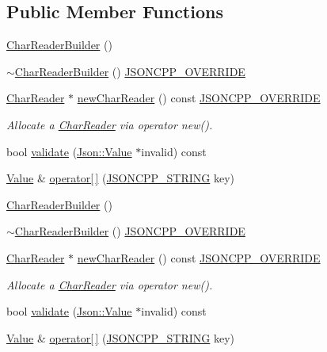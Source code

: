 \subsection*{Public Member Functions}
\begin{DoxyCompactItemize}
\item 
\hyperlink{class_json_1_1_char_reader_builder_a6e197b69a2ede3d87b03b9c5c78ba46a}{Char\+Reader\+Builder} ()
\item 
\hyperlink{class_json_1_1_char_reader_builder_ae8226503f5b947e9d618c39dd992c85c}{$\sim$\+Char\+Reader\+Builder} () \hyperlink{config_8h_a824d6199c91488107e443226fa6022c5}{J\+S\+O\+N\+C\+P\+P\+\_\+\+O\+V\+E\+R\+R\+I\+DE}
\item 
\hyperlink{class_json_1_1_char_reader}{Char\+Reader} $\ast$ \hyperlink{class_json_1_1_char_reader_builder_a3a262fcc76c1eb8eebfd4718fb4e9722}{new\+Char\+Reader} () const \hyperlink{config_8h_a824d6199c91488107e443226fa6022c5}{J\+S\+O\+N\+C\+P\+P\+\_\+\+O\+V\+E\+R\+R\+I\+DE}
\begin{DoxyCompactList}\small\item\em Allocate a \hyperlink{class_json_1_1_char_reader}{Char\+Reader} via operator new(). \end{DoxyCompactList}\item 
bool \hyperlink{class_json_1_1_char_reader_builder_af890b5cb70e9b372e41de5c9e6535d21}{validate} (\hyperlink{class_json_1_1_value}{Json\+::\+Value} $\ast$invalid) const
\item 
\hyperlink{class_json_1_1_value}{Value} \& \hyperlink{class_json_1_1_char_reader_builder_a84b35ef443340c06c0aa7b47851d8d86}{operator\mbox{[}$\,$\mbox{]}} (\hyperlink{config_8h_a1e723f95759de062585bc4a8fd3fa4be}{J\+S\+O\+N\+C\+P\+P\+\_\+\+S\+T\+R\+I\+NG} key)
\item 
\hyperlink{class_json_1_1_char_reader_builder_a6e197b69a2ede3d87b03b9c5c78ba46a}{Char\+Reader\+Builder} ()
\item 
\hyperlink{class_json_1_1_char_reader_builder_ae8226503f5b947e9d618c39dd992c85c}{$\sim$\+Char\+Reader\+Builder} () \hyperlink{config_8h_a824d6199c91488107e443226fa6022c5}{J\+S\+O\+N\+C\+P\+P\+\_\+\+O\+V\+E\+R\+R\+I\+DE}
\item 
\hyperlink{class_json_1_1_char_reader}{Char\+Reader} $\ast$ \hyperlink{class_json_1_1_char_reader_builder_ab14c54e438007a57c1acbd6e7459d4d0}{new\+Char\+Reader} () const \hyperlink{config_8h_a824d6199c91488107e443226fa6022c5}{J\+S\+O\+N\+C\+P\+P\+\_\+\+O\+V\+E\+R\+R\+I\+DE}
\begin{DoxyCompactList}\small\item\em Allocate a \hyperlink{class_json_1_1_char_reader}{Char\+Reader} via operator new(). \end{DoxyCompactList}\item 
bool \hyperlink{class_json_1_1_char_reader_builder_af890b5cb70e9b372e41de5c9e6535d21}{validate} (\hyperlink{class_json_1_1_value}{Json\+::\+Value} $\ast$invalid) const
\item 
\hyperlink{class_json_1_1_value}{Value} \& \hyperlink{class_json_1_1_char_reader_builder_a1ee7bdbd6a7cd27c3c4b34a375204e21}{operator\mbox{[}$\,$\mbox{]}} (\hyperlink{config_8h_a1e723f95759de062585bc4a8fd3fa4be}{J\+S\+O\+N\+C\+P\+P\+\_\+\+S\+T\+R\+I\+NG} key)
\end{DoxyCompactItemize}
